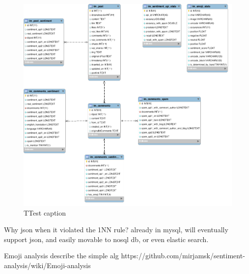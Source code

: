 \begin{figure}[ht]
	\includegraphics[width=1.2\textwidth]{04-framework/01-design/Images/DB_schema.png}
	\caption[Test caption]{TTest caption \label{fig:test-caption}}
\end{figure}


Why json when it violated the 1NN rule? already in mysql, will eventually support json, and easily movable to nosql db, or even elastic search. 

Emoji analysis
describe the simple alg 
https://github.com/mirjamsk/sentiment-analysis/wiki/Emoji-analysis